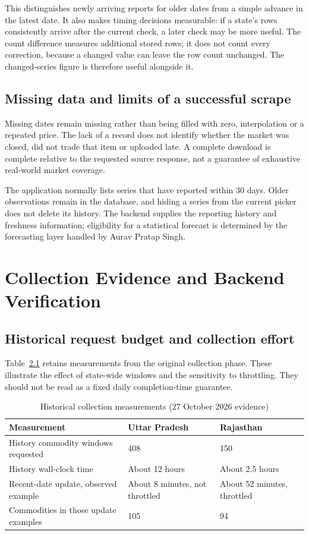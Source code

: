 \documentclass[12pt,a4paper,oneside]{report}
\newcommand{\auravname}{Aurav Pratap Singh}
\numberwithin{equation}{chapter}
\numberwithin{figure}{chapter}
\numberwithin{table}{chapter}
\theoremstyle{definition}
\begin{document}
This distinguishes newly arriving reports for older dates from a simple advance in the latest date. It also makes timing decisions measurable: if a state's rows consistently arrive after the current check, a later check may be more useful. The count difference measures additional stored rows; it does not count every correction, because a changed value can leave the row count unchanged. The changed-series figure is therefore useful alongside it.

\section{Missing data and limits of a successful scrape}
Missing dates remain missing rather than being filled with zero, interpolation or a repeated price. The lack of a record does not identify whether the market was closed, did not trade that item or uploaded late. A complete download is complete relative to the requested source response, not a guarantee of exhaustive real-world market coverage.

The application normally lists series that have reported within 30 days. Older observations remain in the database, and hiding a series from the current picker does not delete its history. The backend supplies the reporting history and freshness information; eligibility for a statistical forecast is determined by the forecasting layer handled by \auravname.

\chapter{Collection Evidence and Backend Verification}

\section{Historical request budget and collection effort}
\label{sec:perf}
Table~\ref{tab:effort} retains measurements from the original collection phase. These illustrate the effect of state-wide windows and the sensitivity to throttling. They should not be read as a fixed daily completion-time guarantee.

\begin{table}[H]
\centering
\caption{Historical collection measurements (27 October 2026 evidence)}
\label{tab:effort}
\small
\begin{tabular}{@{}p{}p{}p{}@{}}
\toprule
Measurement & Uttar Pradesh & Rajasthan \\
\midrule
History commodity windows requested & 408 & 150 \\
History wall-clock time & About 12 hours & About 2.5 hours \\
Recent-date update, observed example & About 8 minutes, not throttled & About 52 minutes, throttled \\
Commodities in those update examples & 105 & 94 \\
\bottomrule
\end{tabular}
\end{table}
\end{document}

